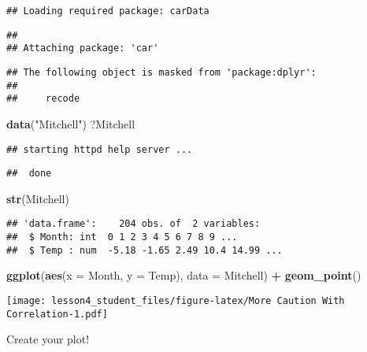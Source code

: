 \documentclass[]{article}
\newenvironment{Shaded}{\begin{snugshade}}{\end{snugshade}}
\newcommand{\KeywordTok}[1]{\textcolor[rgb]{0.13,0.29,0.53}{\textbf{#1}}}
\newcommand{\DataTypeTok}[1]{\textcolor[rgb]{0.13,0.29,0.53}{#1}}
\newcommand{\StringTok}[1]{\textcolor[rgb]{0.31,0.60,0.02}{#1}}
\newcommand{\OperatorTok}[1]{\textcolor[rgb]{0.81,0.36,0.00}{\textbf{#1}}}
\newcommand{\NormalTok}[1]{#1}
\begin{document}
\begin{verbatim}
## Loading required package: carData
\end{verbatim}

\begin{verbatim}
## 
## Attaching package: 'car'
\end{verbatim}

\begin{verbatim}
## The following object is masked from 'package:dplyr':
## 
##     recode
\end{verbatim}

\begin{Shaded}
\begin{Highlighting}[]
\KeywordTok{data}\NormalTok{(}\StringTok{"Mitchell"}\NormalTok{)}
\NormalTok{?Mitchell}
\end{Highlighting}
\end{Shaded}

\begin{verbatim}
## starting httpd help server ...
\end{verbatim}

\begin{verbatim}
##  done
\end{verbatim}

\begin{Shaded}
\begin{Highlighting}[]
\KeywordTok{str}\NormalTok{(Mitchell)}
\end{Highlighting}
\end{Shaded}

\begin{verbatim}
## 'data.frame':    204 obs. of  2 variables:
##  $ Month: int  0 1 2 3 4 5 6 7 8 9 ...
##  $ Temp : num  -5.18 -1.65 2.49 10.4 14.99 ...
\end{verbatim}

\begin{Shaded}
\begin{Highlighting}[]
\KeywordTok{ggplot}\NormalTok{(}\KeywordTok{aes}\NormalTok{(}\DataTypeTok{x =}\NormalTok{ Month, }\DataTypeTok{y =}\NormalTok{ Temp), }\DataTypeTok{data =}\NormalTok{ Mitchell) }\OperatorTok{+}
\StringTok{  }\KeywordTok{geom_point}\NormalTok{()}
\end{Highlighting}
\end{Shaded}

\texttt{[image: lesson4\_student\_files/figure-latex/More Caution With Correlation-1.pdf]}

Create your plot!
\end{document}
